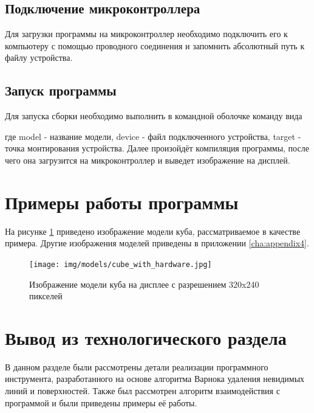 \subsection{Подключение микроконтроллера}
Для загрузки программы на микроконтроллер необходимо подключить его к компьютеру с помощью проводного соединения и запомнить 
абсолютный путь к файлу устройства.

\subsection{Запуск программы}
Для запуска сборки необходимо выполнить в командной оболочке команду вида 

где model - название модели, device - файл подключенного устройства, target - точка монтирования устройства. 
Далее произойдёт компиляция программы, после чего она загрузится на микроконтроллер и выведет изображение на дисплей. 



\section{Примеры работы программы}
На рисунке \ref{fig:cube} приведено изображение модели куба, рассматриваемое в качестве примера. Другие изображения моделей приведены в 
приложении \ref{cha:appendix4}.

\newpage
\begin{figure}[h]
	\centering
	\texttt{[image: img/models/cube\_with\_hardware.jpg]}
	\caption{Изображение модели куба на дисплее с разрешением 320x240 пикселей}
	\label{fig:cube}
\end{figure} 





\section{Вывод из технологического раздела}
В данном разделе были рассмотрены детали реализации программного инструмента, разработанного на основе алгоритма Варнока удаления 
невидимых линий и поверхностей. Также был рассмотрен алгоритм взаимодействия с программой и были приведены примеры её работы.
